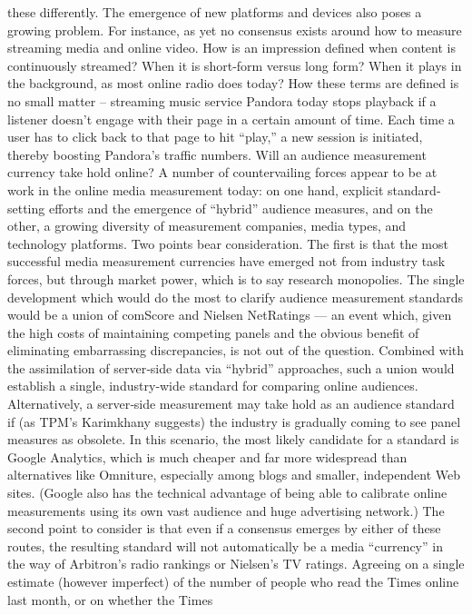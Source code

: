 these differently.
The emergence of new platforms and devices also poses a growing
problem. For instance, as yet no consensus exists around how to measure
streaming media and online video. How is an impression defined when
content is continuously streamed? When it is short‐form versus long
form? When it plays in the background, as most online radio does today?
How these terms are defined is no small matter – streaming music service
Pandora today stops playback if a listener doesn’t engage with their page
in a certain amount of time. Each time a user has to click back to that page
to hit ``play,'' a new session is initiated, thereby boosting Pandora’s traffic
numbers.
Will an audience measurement currency take hold online?
A number of countervailing forces appear to be at work in the online
media measurement today: on one hand, explicit standard‐setting efforts
and the emergence of ``hybrid'' audience measures, and on the other, a
growing diversity of measurement companies, media types, and
technology platforms.
Two points bear consideration. The first is that the most successful media
measurement currencies have emerged not from industry task forces, but
through market power, which is to say research monopolies. The single
development which would do the most to clarify audience measurement
standards would be a union of comScore and Nielsen NetRatings — an
event which, given the high costs of maintaining competing panels and
the obvious benefit of eliminating embarrassing discrepancies, is not out
of the question.
Combined with the assimilation of server‐side data via ``hybrid''
approaches, such a union would establish a single, industry‐wide
standard for comparing online audiences. Alternatively, a server‐side
measurement may take hold as an audience standard if (as TPM’s
Karimkhany suggests) the industry is gradually coming to see panel
measures as obsolete. In this scenario, the most likely candidate for a
standard is Google Analytics, which is much cheaper and far more
widespread than alternatives like Omniture, especially among blogs and
smaller, independent Web sites. (Google also has the technical advantage
of being able to calibrate online measurements using its own vast
audience and huge advertising network.)
The second point to consider is that even if a consensus emerges by either
of these routes, the resulting standard will not automatically be a media
``currency'' in the way of Arbitron’s radio rankings or Nielsen’s TV
ratings. Agreeing on a single estimate (however imperfect) of the number
of people who read the Times online last month, or on whether the Times
